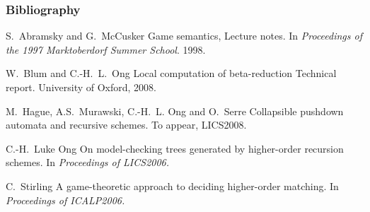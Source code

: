 \begin{frame} \frametitle<presentation>{Bibliography}

  \begin{thebibliography}{10}
  \beamertemplatearticlebibitems
    S.~Abramsky and G.~McCusker
    \newblock Game semantics, Lecture notes.
    \newblock In {\em Proceedings of the 1997 Marktoberdorf Summer School}. 1998.

    W.~Blum and C.-H.~L.~Ong
    \newblock Local computation of beta-reduction
    \newblock Technical report. University of Oxford, 2008.


    M.~Hague, A.S.~Murawski, C.-H.~L. Ong and O.~Serre
    \newblock Collapsible pushdown automata and recursive schemes.
    \newblock To appear, LICS2008.

    C.-H.~Luke Ong
    \newblock On model-checking trees generated by higher-order recursion schemes.
    \newblock In {\em Proceedings of LICS2006.}

    C.~Stirling
    \newblock A game-theoretic approach to deciding higher-order matching.
    \newblock In {\em Proceedings of ICALP2006.}

  \end{thebibliography}
\end{frame}







